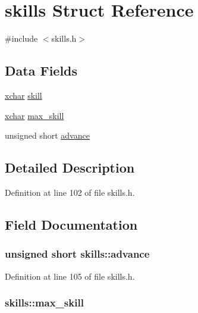 \hypertarget{structskills}{\section{skills Struct Reference}
\label{structskills}
}


{\ttfamily \#include $<$skills.\+h$>$}

\subsection*{Data Fields}
\begin{DoxyCompactItemize}
\item 
\hyperlink{global_8h_a2043b7d01ce89f4ee2fa6c345a752d32}{xchar} \hyperlink{structskills_aada4693a6fea3ed45385506066006c67}{skill}
\item 
\hyperlink{global_8h_a2043b7d01ce89f4ee2fa6c345a752d32}{xchar} \hyperlink{structskills_a1afe43af943a6ae84f3a2b3d8af511db}{max\+\_\+skill}
\item 
unsigned short \hyperlink{structskills_a837c2e3ccfa67ffac8144a8cb793043e}{advance}
\end{DoxyCompactItemize}


\subsection{Detailed Description}


Definition at line 102 of file skills.\+h.



\subsection{Field Documentation}
\hypertarget{structskills_a837c2e3ccfa67ffac8144a8cb793043e}{
\subsubsection[{advance}]{\setlength{\rightskip}{0pt plus 5cm}unsigned short skills\+::advance}}\label{structskills_a837c2e3ccfa67ffac8144a8cb793043e}


Definition at line 105 of file skills.\+h.

\hypertarget{structskills_a1afe43af943a6ae84f3a2b3d8af511db}{
\subsubsection[{max\+\_\+skill}]{ skills\+::max\+\_\+skill}}\label{structskills_a1afe43af943a6ae84f3a2b3d8af511db}


